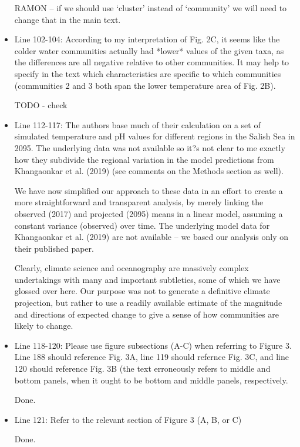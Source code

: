 \documentclass[11pt]{article}
\begin{document}
\begin{linenumbers}
\begin{itemize}
{\color{red} RAMON -- if we should use `cluster' instead of `community' we will need to change that in the main text. }


\item{Line 102-104: According to my interpretation of Fig. 2C, it seems like the colder water communities actually had *lower* values of the given taxa, as the differences are all negative relative to other communities. It may help to specify in the text which characteristics are specific to which communities (communities 2 and 3 both span the lower temperature area of Fig. 2B).}

{\color{red} TODO - check }


\item{Line 112-117: The authors base much of their calculation on a set of simulated temperature and pH values for different regions in the Salish Sea in 2095. The underlying data was not available so it?s not clear to me exactly how they subdivide the regional variation in the model predictions from Khangaonkar et al. (2019) (see comments on the Methods section as well).}

We have now simplified our approach to these data in an effort to create a more straightforward and transparent analysis, by merely linking the observed (2017) and projected (2095) means in a linear model, assuming a constant variance (observed) over time. The underlying model data for Khangaonkar et al. (2019) are not available -- we based our analysis only on their published paper. 

Clearly, climate science and oceanography are massively complex undertakings with many and important subtleties, some of which we have glossed over here. Our purpose was not to generate a definitive climate projection, but rather to use a readily available estimate of the magnitude and directions of expected change to give a sense of how communities are likely to change. 

\item{Line 118-120: Please use figure subsections (A-C) when referring to Figure 3. Line 188 should reference Fig. 3A, line 119 should refernce Fig. 3C, and line 120 should reference Fig. 3B (the text erroneously refers to middle and bottom panels, when it ought to be bottom and middle panels, respectively.}

Done.

\item{Line 121: Refer to the relevant section of Figure 3 (A, B, or C)}

Done.


\end{itemize}
\end{linenumbers}
\end{document}
